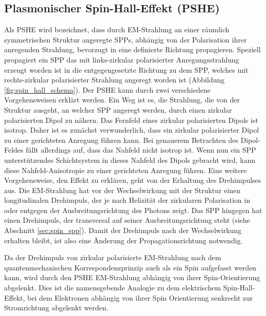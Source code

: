 \documentclass[titlepage,  ngerman]{article}
\begin{document}
	\subsection{Plasmonischer Spin-Hall-Effekt (PSHE)}
	Als PSHE wird bezeichnet, dass durch EM-Strahlung an einer räumlich symmetrischen Struktur angeregte SPPs, abhängig von der Polarisation ihrer anregenden Strahlung, bevorzugt in eine definierte Richtung propagieren. Speziell propagiert ein SPP das mit links-zirkular polarisierter Anregungsstrahlung erzeugt worden ist in die entgegengesetzte Richtung zu dem SPP, welches mit rechts-zirkular polarisierter Strahlung angeregt worden ist (Abbildung \ref{fig:spin_hall_schema}). Der PSHE kann durch zwei verschiedene Vorgehensweisen erklärt werden. Ein Weg ist es, die Strahlung, die von der Struktur ausgeht, an welcher SPP angeregt werden, durch einen zirkular polarisierten Dipol zu nähern. Das Fernfeld eines zirkular polarisierten Dipols ist isotrop. Daher ist es zunächst verwunderlich, dass ein zirkular polarisierter Dipol zu einer gerichteten Anregung führen kann. Bei genauerem Betrachten des Dipol-Feldes fällt allerdings auf, dass das Nahfeld nicht isotrop ist. Wenn nun ein SPP unterstützendes Schichtsystem in dieses Nahfeld des Dipols gebracht wird, kann diese Nahfeld-Anisotropie zu einer gerichteten Anregung führen.
	Eine weitere Vorgehensweise, den Effekt zu erklären, geht von der Erhaltung des Drehimpulses aus. Die EM-Strahlung hat vor der Wechselwirkung mit der Struktur einen longitudinalen Drehimpuls, der je nach Helizität der zirkularen Polarisation in oder entgegen der Ausbreitungsrichtung des Photons zeigt. Das SPP hingegen hat einen Drehimpuls, der transversal auf seiner Ausbreitungsrichtung steht (siehe Abschnitt \ref{sec:spin_spp}). Damit der Drehimpuls nach der Wechselwirkung erhalten bleibt, ist also eine Änderung der Propagationsrichtung notwendig. 
	
	Da der Drehimpuls von zirkular polarisierte EM-Strahlung nach dem quantenmechanischen Korrespondenzprinzip auch als ein Spin aufgefasst werden kann, wird durch den PSHE EM-Strahlung abhängig von ihrer Spin-Orientierung abgelenkt. Dies ist die namensgebende Analogie zu dem elektrischem Spin-Hall-Effekt, bei dem Elektronen abhängig von ihrer Spin Orientierung senkrecht zur Stromrichtung abgelenkt werden\cite{Inoue.2005}.
\end{document}
